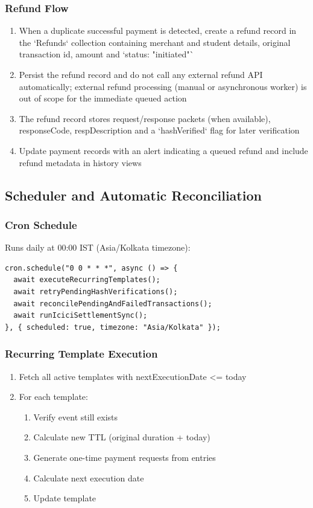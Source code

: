 \documentclass[12pt,a4paper]{article}
\begin{document}
\subsubsection{Refund Flow}
\begin{enumerate}
  \item When a duplicate successful payment is detected, create a refund record in the `Refunds` collection containing merchant and student details, original transaction id, amount and `status: "initiated"`
  \item Persist the refund record and do not call any external refund API automatically; external refund processing (manual or asynchronous worker) is out of scope for the immediate queued action
  \item The refund record stores request/response packets (when available), responseCode, respDescription and a `hashVerified` flag for later verification
  \item Update payment records with an alert indicating a queued refund and include refund metadata in history views
\end{enumerate}

\subsection{Scheduler and Automatic Reconciliation}

\subsubsection{Cron Schedule}
Runs daily at 00:00 IST (Asia/Kolkata timezone):
\begin{lstlisting}
cron.schedule("0 0 * * *", async () => {
  await executeRecurringTemplates();
  await retryPendingHashVerifications();
  await reconcilePendingAndFailedTransactions();
  await runIciciSettlementSync();
}, { scheduled: true, timezone: "Asia/Kolkata" });
\end{lstlisting}

\subsubsection{Recurring Template Execution}
\begin{enumerate}
  \item Fetch all active templates with nextExecutionDate <= today
  \item For each template:
    \begin{enumerate}
      \item Verify event still exists
      \item Calculate new TTL (original duration + today)
      \item Generate one-time payment requests from entries
      \item Calculate next execution date
      \item Update template
    \end{enumerate}
\end{enumerate}
\end{document}
